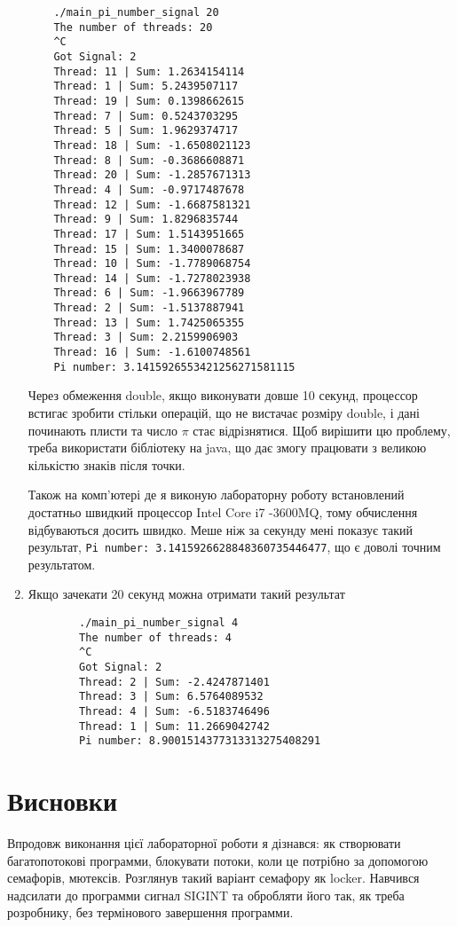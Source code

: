 \documentclass{article}
\begin{document}
\begin{enumerate}
\begin{verbatim}
	./main_pi_number_signal 20
	The number of threads: 20
	^C
	Got Signal: 2
	Thread: 11 | Sum: 1.2634154114
	Thread: 1 | Sum: 5.2439507117
	Thread: 19 | Sum: 0.1398662615
	Thread: 7 | Sum: 0.5243703295
	Thread: 5 | Sum: 1.9629374717
	Thread: 18 | Sum: -1.6508021123
	Thread: 8 | Sum: -0.3686608871
	Thread: 20 | Sum: -1.2857671313
	Thread: 4 | Sum: -0.9717487678
	Thread: 12 | Sum: -1.6687581321
	Thread: 9 | Sum: 1.8296835744
	Thread: 17 | Sum: 1.5143951665
	Thread: 15 | Sum: 1.3400078687
	Thread: 10 | Sum: -1.7789068754
	Thread: 14 | Sum: -1.7278023938
	Thread: 6 | Sum: -1.9663967789
	Thread: 2 | Sum: -1.5137887941
	Thread: 13 | Sum: 1.7425065355
	Thread: 3 | Sum: 2.2159906903
	Thread: 16 | Sum: -1.6100748561
	Pi number: 3.1415926553421256271581115
	\end{verbatim} 
	
	Через обмеження double, якщо виконувати довше 10 секунд, процессор встигає зробити стільки операцій, що не вистачає розміру double, і дані починають плисти та число $\pi$ стає відрізнятися. Щоб вирішити цю проблему, треба використати бібліотеку на java, що дає змогу працювати з великою кількістю знаків після точки.
	
	Також на комп'ютері де я виконую лабораторну роботу встановлений достатньо швидкий процессор Intel Core i7 -3600MQ, тому обчислення відбуваються досить швидко. Меше ніж за секунду мені показує такий результат, \verb|Pi number: 3.1415926628848360735446477|, що є доволі точним результатом.
	
	\item Якщо зачекати 20 секунд можна отримати такий результат\vspace{-3mm}
	\begin{verbatim}
		./main_pi_number_signal 4
		The number of threads: 4
		^C
		Got Signal: 2
		Thread: 2 | Sum: -2.4247871401
		Thread: 3 | Sum: 6.5764089532
		Thread: 4 | Sum: -6.5183746496
		Thread: 1 | Sum: 11.2669042742
		Pi number: 8.9001514377313313275408291
	\end{verbatim}
		
\end{enumerate}

\section{Висновки}
\large
Впродовж виконання цієї лабораторної роботи я дізнався: як створювати багатопотокові программи, блокувати потоки, коли це потрібно за допомогою семафорів, мютексів. Розглянув такий варіант семафору як locker. Навчився надсилати до программи сигнал SIGINT та обробляти його так, як треба розробнику, без термінового завершення программи.
\end{document}
